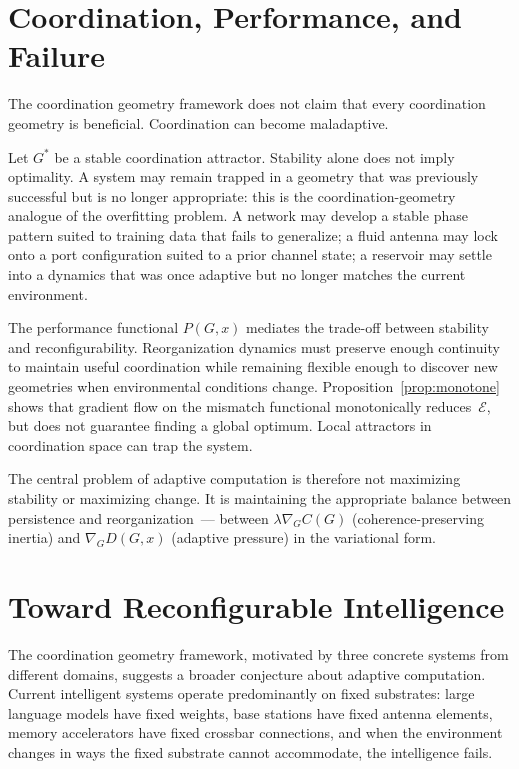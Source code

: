 \documentclass[11pt, a4paper]{article}
\theoremstyle{definition}
\theoremstyle{remark}
\begin{document}
\section{Coordination, Performance, and Failure}

The coordination geometry framework does not claim that every coordination
geometry is beneficial. Coordination can become maladaptive.

Let $G^*$ be a stable coordination attractor. Stability alone does not imply
optimality. A system may remain trapped in a geometry that was previously
successful but is no longer appropriate: this is the coordination-geometry
analogue of the overfitting problem. A network may develop a stable phase
pattern suited to training data that fails to generalize; a fluid antenna may
lock onto a port configuration suited to a prior channel state; a reservoir
may settle into a dynamics that was once adaptive but no longer matches
the current environment.

The performance functional $P(G, x)$ mediates the trade-off between
stability and reconfigurability. Reorganization dynamics must preserve enough
continuity to maintain useful coordination while remaining flexible enough
to discover new geometries when environmental conditions change.
Proposition~\ref{prop:monotone} shows that gradient flow on the mismatch
functional monotonically reduces~$\mathcal{E}$, but does not guarantee
finding a global optimum. Local attractors in coordination space can
trap the system.

The central problem of adaptive computation is therefore not maximizing
stability or maximizing change. It is maintaining the appropriate balance
between persistence and reorganization~--- between
$\lambda \nabla_G C(G)$ (coherence-preserving inertia) and
$\nabla_G D(G,x)$ (adaptive pressure) in the variational form.

\section{Toward Reconfigurable Intelligence}

The coordination geometry framework, motivated by three concrete systems
from different domains, suggests a broader conjecture about adaptive
computation. Current intelligent systems operate predominantly on fixed
substrates: large language models have fixed weights, base stations have
fixed antenna elements, memory accelerators have fixed crossbar connections,
and when the environment changes in ways the fixed substrate cannot
accommodate, the intelligence fails.
\end{document}
